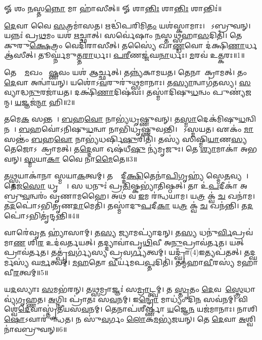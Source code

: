 \setcounter{anuvakam}{0}

𑍐 𑌶𑌂 \ul{𑌨}𑌸𑍍𑌤\ul{𑌨𑍍𑌨𑍋} 𑌮𑌾 𑌹𑌾॑𑌸𑍀𑌤𑍍॥ 𑍐 𑌶𑌾\ul{𑌨𑍍𑌤𑌿𑌃} 𑌶𑌾\ul{𑌨𑍍𑌤𑌿𑌃} 𑌶𑌾𑌨𑍍𑌤𑌿𑌃॑॥

\ul{𑌦𑍇}𑌵𑌾 𑌵𑍈 \ul{𑌸}𑌤𑍍𑌰𑌮𑌾॑𑌸𑌤। 
𑌋𑌦𑍍𑌧𑌿॑𑌪𑌰𑌿𑌮𑌿\ul{𑌤𑌂} 𑌯𑌶॑𑌸𑍍𑌕𑌾𑌮𑌾𑌃। 
𑌤𑍇᳚𑌽𑌬𑍍𑌰𑍁𑌵𑌨𑍍। 
𑌯𑌨𑍍𑌨𑌃॑ 𑌪𑍍𑌰\ul{𑌥}𑌮𑌂 𑌯𑌶॑ \ul{𑌋}𑌚𑍍𑌛𑌾𑌤𑍍। 
𑌸𑌰𑍍𑌵𑍇॑𑌷𑌾𑌂 \ul{𑌨}𑌸𑍍𑌤\ul{𑌥𑍍𑌸}𑌹𑌾\ul{𑌸}𑌦𑌿𑌤𑌿॑। 
𑌤𑍇𑌷𑌾𑌂᳚ 𑌕𑍁𑌰𑍁\ul{𑌕𑍍𑌷𑍇}𑌤𑍍𑌰𑌂 𑌵𑍇𑌦𑌿॑𑌰𑌾𑌸𑍀𑌤𑍍। 
𑌤𑌸𑍍𑌯𑍈॑ 𑌖𑌾\ul{𑌣𑍍𑌡}𑌵𑍋 𑌦॑𑌕𑍍𑌷𑌿\ul{𑌣𑌾}𑌰𑍍𑌧 𑌆॑𑌸𑍀𑌤𑍍। 
𑌤𑍂𑌰𑍍𑌘𑍍𑌨॑𑌮𑍁𑌤𑍍𑌤\ul{𑌰𑌾}𑌰𑍍𑌧𑌃। 
\ul{𑌪}\ul{𑌰𑍀}𑌣𑌜𑍍𑌜॑𑌘\ul{𑌨𑌾}𑌰𑍍𑌧𑌃। 
\ul{𑌮}𑌰𑌵॑ 𑌉\ul{𑌤𑍍𑌕}𑌰𑌃॥1॥

𑌤𑍇𑌷𑌾𑌂᳚ \ul{𑌮}𑌖𑌂 𑌵𑍈᳚\ul{𑌷𑍍𑌣}𑌵𑌂 𑌯𑌶॑ 𑌆𑌰𑍍𑌚𑍍𑌛𑌤𑍍। 
𑌤𑌨𑍍𑌨𑍍𑌯॑𑌕𑌾𑌮𑌯𑌤। 
𑌤𑍇𑌨𑌾𑌪𑌾᳚𑌕𑍍𑌰𑌾𑌮𑌤𑍍। 
𑌤𑌂 \ul{𑌦𑍇}𑌵𑌾 𑌅𑌨𑍍𑌵𑌾॑𑌯𑌨𑍍। 
𑌯𑌶𑍋॑𑌽\ul{𑌵}𑌰𑍁𑌰𑍁॑𑌥𑍍𑌸𑌮𑌾𑌨𑌾𑌃। 
𑌤\ul{𑌸𑍍𑌯𑌾}𑌨𑍍𑌵𑌾𑌗॑𑌤𑌸𑍍𑌯। 
\ul{𑌸}𑌵𑍍𑌯𑌾𑌦𑍍𑌧\ul{𑌨𑍁}𑌰𑌜𑌾॑𑌯𑌤। 
𑌦𑌕𑍍𑌷𑌿॑\ul{𑌣𑌾}𑌦𑌿𑌷॑𑌵𑌃। 
𑌤𑌸𑍍𑌮𑌾॑𑌦𑌿𑌷𑍁\ul{𑌧}𑌨𑍍𑌵𑌂 𑌪𑍁𑌣𑍍𑌯॑𑌜𑌨𑍍𑌮। 
\ul{𑌯}𑌜𑍍𑌞𑌜॑\ul{𑌨𑍍𑌮𑌾} 𑌹𑌿॥2॥

𑌤𑌮𑍇\ul{𑌕}\ul{} 𑌸𑌨𑍍𑌤𑌮𑍍᳚। 
\ul{𑌬}𑌹\ul{𑌵𑍋} 𑌨𑌾𑌭𑍍𑌯॑𑌧𑍃𑌷𑍍𑌣𑍁𑌵𑌨𑍍। 
𑌤\ul{𑌸𑍍𑌮𑌾}𑌦𑍇𑌕॑𑌮𑌿𑌷𑍁\ul{𑌧}𑌨𑍍𑌵𑌿\-𑌨𑌮𑍍᳚। 
\ul{𑌬}𑌹𑌵𑍋॑𑌽𑌨𑌿𑌷𑍁\ul{𑌧}𑌨𑍍𑌵𑌾 𑌨𑌾𑌭𑌿𑌧𑍃॑𑌷𑍍𑌣𑍁𑌵𑌨𑍍𑌤𑌿। 
𑌸𑍋᳚𑌽𑌸𑍍𑌮𑌯𑌤। 
𑌏𑌕𑌂॑ \ul{𑌮𑌾} 𑌸𑌨𑍍𑌤𑌂॑ \ul{𑌬}𑌹\ul{𑌵𑍋} 𑌨𑌾𑌭𑍍𑌯॑𑌧𑌰𑍍\mbox{}𑌷𑌿\ul{𑌷𑍁}𑌰𑌿𑌤𑌿॑। 
𑌤𑌸𑍍𑌯॑ 𑌸𑌿𑌷𑍍𑌮𑌿\ul{𑌯𑌾}𑌣\ul{𑌸𑍍𑌯} 𑌤𑍇𑌜𑍋𑌽𑌪𑌾᳚𑌕𑍍𑌰𑌾𑌮𑌤𑍍। 
𑌤\ul{𑌦𑍍𑌦𑍇}𑌵𑌾 𑌓𑌷॑𑌧𑍀\ul{𑌷𑍁} 𑌨𑍍𑌯॑𑌮𑍃𑌜𑍁𑌃। 
𑌤𑍇 \ul{𑌶𑍍𑌯𑌾}𑌮𑌾𑌕𑌾॑ 𑌅𑌭𑌵𑌨𑍍। 
\ul{𑌸𑍍𑌮}𑌯𑌾\ul{𑌕𑌾} 𑌵𑍈 𑌨𑌾\ul{𑌮𑍈}𑌤𑍇॥3॥

𑌤\ul{𑌥𑍍𑌸𑍍𑌮}𑌯𑌾𑌕𑌾॑𑌨𑌾 𑌸𑍍𑌮𑌯𑌾\ul{𑌕}𑌤𑍍𑌵𑌮𑍍। 
𑌤𑌸𑍍𑌮𑌾᳚𑌦𑍍𑌦𑍀\ul{𑌕𑍍𑌷𑌿}𑌤𑍇𑌨𑌾॑\ul{𑌪𑌿}𑌗𑍃𑌹𑍍𑌯॑ 𑌸𑍍𑌮𑍇\ul{𑌤}𑌵𑍍𑌯𑌮𑍍᳚। 
𑌤𑍇𑌜॑\ul{𑌸𑍋} 𑌧𑍃𑌤𑍍𑌯𑍈᳚। 
𑌸 𑌧𑌨𑍁𑌃॑ 𑌪𑍍𑌰\ul{𑌤𑌿}𑌷𑍍𑌕𑌭𑍍𑌯𑌾॑𑌤𑌿𑌷𑍍𑌠𑌤𑍍। 
𑌤𑌾 𑌉॑\ul{𑌪}𑌦𑍀𑌕𑌾॑ 𑌅𑌬𑍍𑌰𑍁\ul{𑌵}𑌨𑍍𑌵𑌰𑌂॑ 𑌵𑍃𑌣𑌾𑌮𑌹𑍈। 
𑌅𑌥॑ 𑌵 \ul{𑌇}𑌮 𑌰॑𑌨𑍍𑌧𑌯𑌾𑌮। 
𑌯\ul{𑌤𑍍𑌰} 𑌕𑍍𑌵॑ \ul{𑌚} 𑌖𑌨𑌾॑𑌮। 
𑌤\ul{𑌦}𑌪𑍋॑𑌽𑌭𑌿𑌤𑍃॑𑌣\ul{𑌦𑌾}𑌮𑍇𑌤𑌿॑। 
𑌤𑌸𑍍𑌮𑌾॑𑌦𑍁\ul{𑌪}𑌦𑍀\ul{𑌕𑌾} 𑌯\ul{𑌤𑍍𑌰} 𑌕𑍍𑌵॑ \ul{𑌚} 𑌖𑌨॑𑌨𑍍𑌤𑌿। 
𑌤\ul{𑌦}𑌪𑍋॑𑌽𑌭𑌿𑌤𑍃॑𑌨𑍍𑌦𑌨𑍍𑌤𑌿॥4॥

𑌵𑌾𑌰𑍇॑𑌵𑍃\ul{𑌤}\ul{} 𑌹𑍍𑌯𑌾॑𑌸𑌾𑌮𑍍। 
𑌤\ul{𑌸𑍍𑌯} 𑌜𑍍𑌯𑌾𑌮𑌪𑍍𑌯𑌾॑𑌦𑌨𑍍। 
𑌤\ul{𑌸𑍍𑌯} 𑌧𑌨𑍁॑\ul{𑌰𑍍𑌵𑌿}𑌪𑍍𑌰𑌵॑𑌮𑌾\ul{𑌣}\ul{} 𑌶𑌿\ul{𑌰} 𑌉𑌦॑𑌵𑌰𑍍𑌤𑌯𑌤𑍍। 
𑌤𑌦𑍍𑌦𑍍𑌯𑌾𑌵𑌾॑𑌪𑍃\ul{𑌥𑌿}𑌵𑍀 𑌅\ul{𑌨𑍁}𑌪𑍍𑌰𑌾𑌵॑𑌰𑍍𑌤𑌤। 
𑌯𑌤𑍍 𑌪𑍍𑌰𑌾𑌵॑𑌰𑍍𑌤𑌤। 
𑌤𑌤𑍍𑌪𑍍𑌰॑\ul{𑌵}𑌰𑍍𑌗𑍍𑌯॑𑌸𑍍𑌯 𑌪𑍍𑌰𑌵\ul{𑌰𑍍𑌗𑍍𑌯}𑌤𑍍𑌵𑌮𑍍। 
𑌯𑌦𑍍𑌘𑍍𑌰𑌾𑌁(4)𑌇𑌤𑍍𑌯𑌪॑𑌤𑌤𑍍। 
𑌤𑌦𑍍\mbox{}\ul{𑌘}𑌰𑍍𑌮𑌸𑍍𑌯॑ 𑌘\ul{𑌰𑍍𑌮}𑌤𑍍𑌵𑌮𑍍। 
\ul{𑌮}\ul{𑌹}𑌤𑍋 \ul{𑌵𑍀}𑌰𑍍𑌯॑𑌮𑌪\ul{𑌪𑍍𑌤}𑌦𑌿𑌤𑌿॑। 
𑌤𑌨𑍍𑌮॑𑌹𑌾\ul{𑌵𑍀}𑌰𑌸𑍍𑌯॑ 𑌮𑌹𑌾𑌵𑍀\ul{𑌰}𑌤𑍍𑌵𑌮𑍍॥5॥

𑌯\ul{𑌦}𑌸𑍍𑌯𑌾𑌃 \ul{𑌸}𑌮𑌭॑𑌰𑌨𑍍। 
𑌤\ul{𑌥𑍍𑌸}𑌮𑍍𑌰𑌾𑌜𑍍𑌞𑌃॑ 𑌸\ul{𑌮𑍍𑌰𑌾}𑌟𑍍𑌤𑍍𑌵𑌮𑍍। 
𑌤 \ul{𑌸𑍍𑌤𑍃}𑌤𑌂 \ul{𑌦𑍇}𑌵𑌤𑌾᳚\ul{𑌸𑍍𑌤𑍍𑌰𑍇}𑌧𑌾 𑌵𑍍𑌯॑𑌗𑍃𑌹𑍍𑌣𑌤। 
\ul{𑌅}𑌗𑍍𑌨𑌿𑌃 𑌪𑍍𑌰𑌾॑𑌤𑌃 𑌸\ul{𑌵}𑌨𑌮𑍍। 
𑌇\ul{𑌨𑍍𑌦𑍍𑌰𑍋} 𑌮𑌾𑌧𑍍𑌯𑌂॑ 𑌦𑌿\ul{𑌨}\ul{} 𑌸𑌵॑𑌨𑌮𑍍। 
𑌵𑌿𑌶𑍍𑌵𑍇॑\ul{𑌦𑍇}𑌵𑌾𑌸𑍍𑌤𑍃॑𑌤𑍀𑌯𑌸\ul{𑌵}𑌨𑌮𑍍। 
𑌤𑍇𑌨𑌾𑌪॑𑌶𑍀𑌰𑍍𑌷𑍍𑌣𑌾 \ul{𑌯}𑌜𑍍𑌞𑍇\ul{𑌨} 𑌯𑌜॑𑌮𑌾𑌨𑌾𑌃। 
𑌨𑌾𑌶𑌿\ul{𑌷𑍋}𑌽𑌵𑌾𑌰𑍁॑𑌨𑍍𑌧𑌤। 
𑌨 𑌸𑍁॑\ul{𑌵}𑌰𑍍𑌗𑌂 \ul{𑌲𑍋}𑌕\ul{𑌮}𑌭𑍍𑌯॑𑌜𑌯𑌨𑍍। 
𑌤𑍇 \ul{𑌦𑍇}𑌵𑌾 \ul{𑌅}𑌶𑍍𑌵𑌿𑌨𑌾॑𑌵𑌬𑍍𑌰𑍁𑌵𑌨𑍍॥6॥


